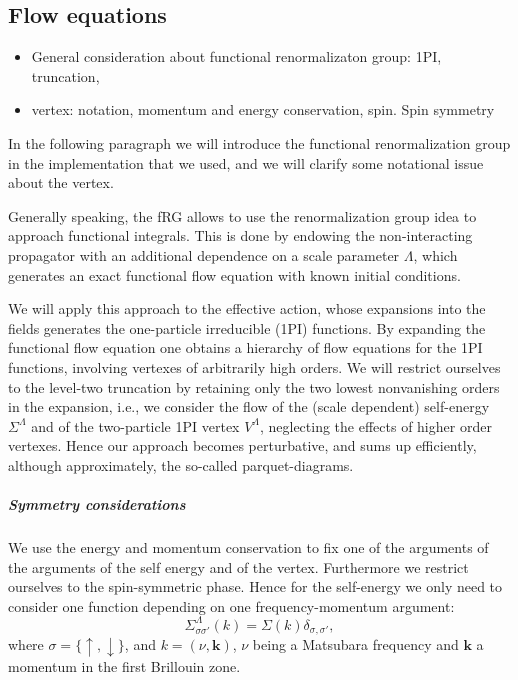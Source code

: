\subsection{Flow equations}

\begin{itemize} 
\item General consideration about functional renormalizaton group: 1PI, truncation, 
\item vertex: notation, momentum and energy conservation, spin. Spin symmetry 

\end{itemize}

In the following paragraph we will introduce the functional renormalization group in the implementation that we used, and we will clarify some notational issue about the vertex. 

Generally speaking, the fRG allows to use the renormalization group idea to approach functional integrals. 
This is done by endowing the non-interacting propagator with an additional dependence on a scale parameter $\Lambda$, which generates an exact functional flow equation with known initial conditions. 

We will apply this approach to the effective action, whose expansions into the fields generates the one-particle irreducible (1PI)  functions. By expanding the functional flow equation one obtains a hierarchy of flow equations for the 1PI functions, involving vertexes of arbitrarily  high orders. 
We will restrict ourselves to the level-two truncation by retaining only the two lowest nonvanishing orders in the expansion, i.e., we consider the flow of the (scale dependent) self-energy $\Sigma^\Lambda$ and of the two-particle 1PI vertex $V^\Lambda$, neglecting the effects of higher order vertexes. 
Hence our approach becomes perturbative, and sums up efficiently, although approximately, the so-called parquet-diagrams. 

\subparagraph*{Symmetry considerations} We use the energy and momentum conservation to fix one of the arguments of the arguments of the self energy and of the vertex. 
Furthermore we restrict ourselves to the spin-symmetric phase. 
Hence for the self-energy  we only need to consider one function depending on one frequency-momentum argument: 
\begin{equation}
\Sigma^\Lambda_{\sigma\sigma'}(k)=\Sigma(k)\delta_{\sigma,\sigma'}, 
\end{equation}
where $\sigma = \{\uparrow, \downarrow\} $, and $k=(\nu,\mathbf{k})$, $\nu$ being a Matsubara frequency and $\mathbf{k}$ a momentum in the first Brillouin zone. 
